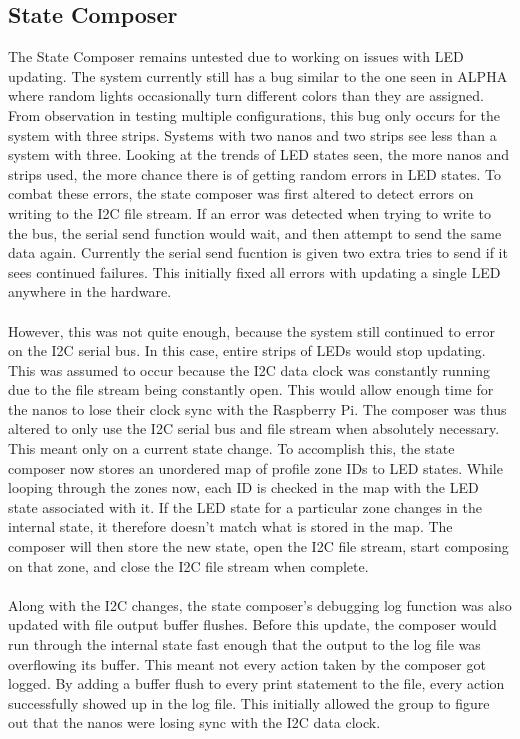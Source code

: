 \documentclass[onecolumn, draftclsnofoot,10pt, compsoc]{IEEEtran}
\begin{document}
	\subsection{State Composer}
		\noindent The State Composer remains untested due to working on issues with LED updating. The system currently still has a bug similar to the one 
		seen in ALPHA where random lights occasionally turn different colors than they are assigned. From observation in testing multiple configurations, 
		this bug only occurs for the system with three strips. Systems with two nanos and two strips see less than a system with three. Looking at the trends 
		of LED states seen,	the more nanos and strips used, the more chance there is of getting random errors in LED states. To combat these errors, the state 
		composer was first altered to detect errors on writing to the I2C file stream. If an error was detected when trying to write to the bus, the 
		serial send function would wait, and then attempt to send the same data again.  Currently the serial send fucntion is given two extra tries to 
		send if it sees continued failures. This initially fixed all errors with updating a single LED anywhere in the hardware. 
		\\\\
		\noindent However, this was not quite enough, because the system still continued to error on the I2C serial bus. In this case, entire strips of LEDs 
		would stop updating. This was assumed to occur because the I2C data clock was constantly running due to the file stream being constantly open. This 
		would allow enough time for the nanos to lose their clock sync with the Raspberry Pi. The composer was thus altered to only use the I2C serial bus and 
		file stream when absolutely necessary. This meant only on a current state change. To accomplish this, the state composer now stores an unordered map 
		of profile zone IDs to LED states. While looping through the zones now, each ID is checked in the map with the LED state associated with it. If the LED 
		state for a particular zone changes in the internal state, it therefore doesn't match what is stored in the map. The composer will then store the new 
		state, open the I2C file stream, start composing on that zone, and close the I2C file stream when complete. 
		\\\\
		\noindent Along with the I2C changes, the state composer's debugging log function was also updated with file output buffer flushes. Before this 
		update, the	composer would run through the internal state fast enough that the output to the log file was overflowing its buffer. This meant not every 
		action taken by the composer got logged. By adding a buffer flush to every print statement to the file, every action successfully showed up in the log 
		file. This initially allowed the group to figure out that the nanos were losing sync with the I2C data clock. 
		\\\\
\end{document}

